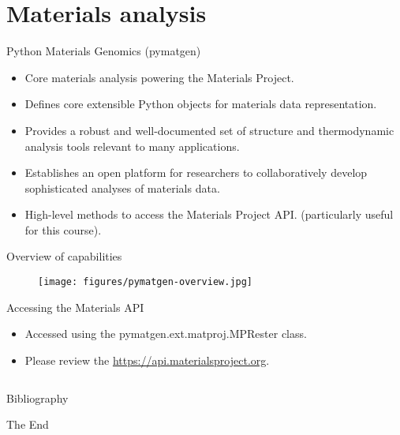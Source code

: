 \documentclass[aspectratio=169]{beamer}
\begin{document}
    \section{Materials analysis}

    \begin{frame}{Python Materials Genomics (pymatgen)}
        \begin{itemize}
            \item Core materials analysis powering the Materials Project.\cite{ongPythonMaterialsGenomics2013}
            \item Defines core extensible Python objects for materials data representation.
            \item Provides a robust and well-documented set of structure and thermodynamic analysis tools relevant to many applications.
            \item Establishes an open platform for researchers to collaboratively develop sophisticated analyses of materials data.
            \item High-level methods to access the Materials Project API.\cite{ongMaterialsApplicationProgramming2015} (particularly useful for this course).
        \end{itemize}
    \end{frame}


    \begin{frame}{Overview of capabilities}
        \begin{figure}
            \centering
            \texttt{[image: figures/pymatgen-overview.jpg]}
        \end{figure}
    \end{frame}


    \begin{frame}[fragile]{Accessing the Materials API}
        \begin{itemize}
            \item Accessed using the pymatgen.ext.matproj.MPRester class.
            \item Please review the \href{Materials API documentation}{https://api.materialsproject.org}.
            \inputminted{python}{example_materials_api.py}
        \end{itemize}
    \end{frame}


    \begin{frame}[allowframebreaks]{Bibliography}
        
        
    \end{frame}


    \begin{frame}
        \Huge{\centerline{The End}}
    \end{frame}
\end{document}

